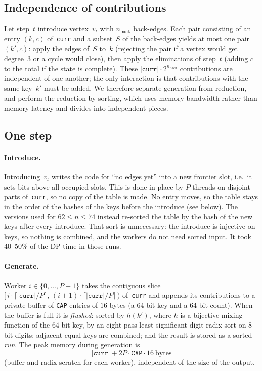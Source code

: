 \documentclass[12pt]{article}
\theoremstyle{definition}
\newcommand{\nb}{n_{\mathrm{back}}}
\newcommand{\curr}{\texttt{curr}}
\begin{document}
\subsection{Independence of contributions}

Let step~$t$ introduce vertex~$v_t$ with $\nb$ back-edges.
Each pair consisting of an entry $(k,c)$ of~\curr{} and a subset~$S$ of the
back-edges yields at most one pair $(k',c)$: apply the edges of~$S$ to~$k$
(rejecting the pair if a vertex would get degree~$3$ or a cycle would close),
then apply the eliminations of step~$t$ (adding $c$ to the total if the
state is complete).
These $|\curr|\cdot 2^{\nb}$ contributions are independent of one another;
the only interaction is that contributions with the same key~$k'$ must be
added.
We therefore separate generation from reduction, and perform the reduction
by sorting, which uses memory bandwidth rather than memory latency and
divides into independent pieces.

\subsection{One step}

\paragraph{Introduce.}
Introducing~$v_t$ writes the code for ``no edges yet'' into a new frontier
slot, i.e.\ it sets bits above all occupied slots.
This is done in place by $P$ threads on disjoint parts of~\curr{}, so no copy
of the table is made.
No entry moves, so the table stays in the order of the hashes of the keys
before the introduce (see below).
The versions used for $62\le n\le 74$ instead re-sorted the table by the hash
of the new keys after every introduce.
That sort is unnecessary: the introduce is injective on keys, so nothing is
combined, and the workers do not need sorted input.
It took $40$--$50\%$ of the DP time in those runs.

\paragraph{Generate.}
Worker $i\in\{0,\ldots,P-1\}$ takes the contiguous slice
$[\,i\cdot\lceil|\curr|/P\rceil,\,(i+1)\cdot\lceil|\curr|/P\rceil\,)$ of~\curr{}
and appends its contributions to a private buffer of
\texttt{CAP} entries of $16$ bytes (a $64$-bit key and a $64$-bit count).
When the buffer is full it is \emph{flushed}: sorted by $h(k')$, where $h$ is
a bijective mixing function of the $64$-bit key, by an eight-pass least
significant digit radix sort on $8$-bit digits; adjacent equal keys are
combined; and the result is stored as a sorted \emph{run}.
The peak memory during generation is
\[
  |\curr| + 2P\cdot\texttt{CAP}\cdot 16\ \text{bytes}
\]
(buffer and radix scratch for each worker), independent of the size of the
output.
\end{document}
